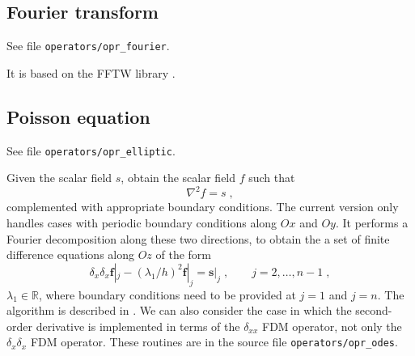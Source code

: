 \subsection{Fourier transform}

See file {\tt operators/opr\_fourier}. 

It is based on the FFTW library \citep{frigo2005design}.



\subsection{Poisson equation}

See file {\tt operators/opr\_elliptic}. 

Given the scalar field $s$, obtain the scalar field $f$ such that
\begin{equation}
  \nabla^2 f= s \;,
\end{equation}
complemented with appropriate boundary conditions.  The current version only handles cases with periodic boundary conditions along $Ox$ and $Oy$. It performs a Fourier decomposition along these two directions, to obtain the a set of finite difference equations along $Oz$ of the form
\begin{equation}
  \delta_x \delta_x \mathbf{f}|_j - (\lambda_1/h)^2\mathbf{f}|_j=\mathbf{s}|_j
  \;,\qquad j=2,\ldots,n-1 \;,
\end{equation}
$\lambda_1\in\mathbb{R}$, where boundary conditions need to be provided at $j=1$ and $j=n$.  The algorithm is described in \cite{mellado2012factorization}. We can also consider the case in which the second-order derivative is implemented in terms of the $\delta_{xx}$ FDM operator, not only the $\delta_x\delta_x$ FDM operator. These routines are in the source file {\tt operators/opr\_odes}.

